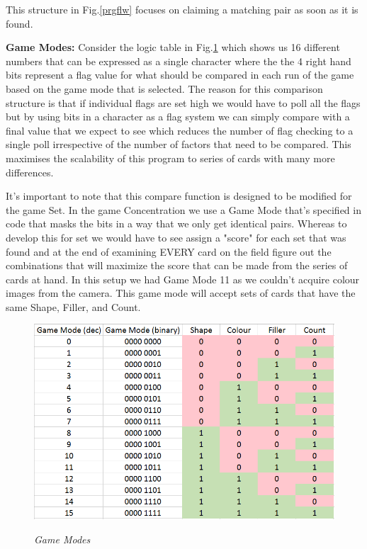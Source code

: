This structure in Fig.\ref{prgflw} focuses on claiming a matching pair as soon as it is found.

\textbf{Game Modes:}
Consider the logic table in Fig.\ref{gmmds} which shows us 16 different numbers that can be expressed as a single character where the the 4 right hand bits represent a flag value for what should be compared in each run of the game based on the game mode that is selected. The reason for this comparison structure is that if individual flags are set high we would have to poll all the flags but by using bits in a character as a flag system we can simply compare with a final value that we expect to see which reduces the number of flag checking to a single poll irrespective of the number of factors that need to be compared. This maximises the scalability of this program to series of cards with many more differences.

It's important to note that this compare function is designed to be modified for the game Set. In the game Concentration we use a Game Mode that's specified in code that masks the bits in a way that we only get identical pairs. Whereas to develop this for set we would have to see assign a "score" for each set that was found and at the end of examining EVERY card on the field figure out the combinations that will maximize the score that can be made from the series of cards at hand. In this setup we had Game Mode 11 as we couldn't acquire colour images from the camera. This game mode will accept sets of cards that have the same Shape, Filler, and Count.
\begin{figure}[position = here]
	\begin{centering}
		\includegraphics[scale=0.6]{./kkimgs/GameModes.png}\\
		\caption[]{\textit{Game Modes\label{gmmds}}}
	\end{centering}
\end{figure}

